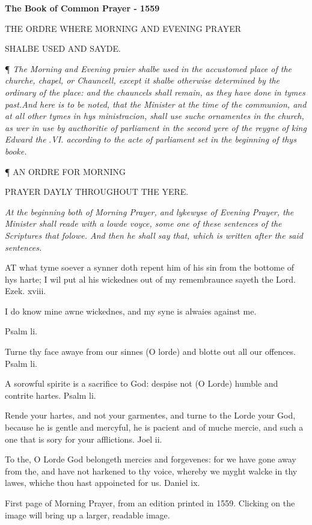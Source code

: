 
\textbf{The Book of Common Prayer - 1559}

THE
ORDRE WHERE MORNING AND EVENING PRAYER

SHALBE
USED AND SAYDE.

¶ \emph{The Morning and Evening praier shalbe used in the accustomed
place of the churche, chapel, or Chauncell, except it shalbe otherwise
determined by the ordinary of the place: and the chauncels shall remain,
as they have done in tymes past.}\emph{And
here is to be noted, that the Minister at the time of the communion, and
at all other tymes in hys ministracion, shall use suche ornamentes in
the church, as wer in use by aucthoritie of parliament in the second yere
of the reygne of king Edward the} .\emph{VI. according to the acte of
parliament set in the beginning of thys booke.}

¶
AN ORDRE FOR MORNING

PRAYER
DAYLY THROUGHOUT THE YERE.

\emph{At the beginning both of Morning Prayer, and lykewyse of Evening Prayer,
the Minister shall reade with a lowde voyce, some one of these sentences
of the Scriptures that folowe. And then he shall say that, which is written
after the said sentences.} 

AT
what tyme soever a synner doth repent him of his sin from the bottome
of hys harte; I wil put al his wickednes out of my remembraunce sayeth
the Lord. Ezek.
xviii.

I do know mine awne wickednes, and my syne is alwaies against me.

Psalm
li.

Turne thy face awaye from our sinnes (O lorde) and blotte out all our
offences. Psalm
li.

A sorowful spirite is a sacrifice to God: despise not (O Lorde)
humble and contrite hartes. Psalm
li.

Rende your hartes, and not your garmentes, and turne to the Lorde your
God, because he is gentle and mercyful, he is pacient and of muche mercie,
and such a one that is sory for your afflictions. Joel
ii.

To the, O Lorde God belongeth mercies and forgevenes: for we have gone
away from the, and have not harkened to thy voice, whereby we myght walcke
in thy lawes, whiche thou hast appoincted for us. Daniel
ix.

First
page of Morning Prayer, from an edition printed in 1559. Clicking on the
image will bring up a larger, readable image.

